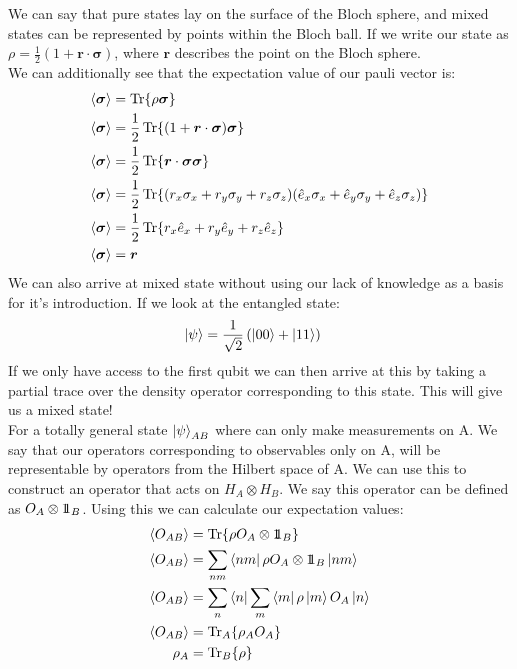 We can say that pure states lay on the surface of the Bloch sphere, and mixed states can be represented by points within the Bloch ball. If we write our state as $\rho = \frac{1}{2}(1 + \bm{r}\cdot\bm{\sigma})$, where $\bm{r}$ describes the point on the Bloch sphere.\\
We can additionally see that the expectation value of our pauli vector is:
\begin{align*}
	\expval{\bm{\sigma}} &= \Tr{\rho\bm{\sigma}} \\
	\expval{\bm{\sigma}} &= \frac{1}{2}\Tr{(1+ \bm{r}\cdot\bm{\sigma})\bm{\sigma}} \\
	\expval{\bm{\sigma}} &= \frac{1}{2}\Tr{\bm{r}\cdot\bm{\sigma}\bm{\sigma}} \\
	\expval{\bm{\sigma}} &= \frac{1}{2}\Tr{(r_x\sigma_x + r_y\sigma_y + r_z\sigma_z)(\hat{e}_x\sigma_x + \hat{e}_y\sigma_y + \hat{e}_z\sigma_z)} \\
	\expval{\bm{\sigma}} &= \frac{1}{2}\Tr{r_x\hat{e}_x + r_y\hat{e}_y + r_z\hat{e}_z} \\
	\expval{\bm{\sigma}} &= \bm{r}
\end{align*}
We can also arrive at mixed state without using our lack of knowledge as a basis for it's introduction. If we look at the entangled state:
\begin{align*}
	\ket{\psi} &= \frac{1}{\sqrt{2}} \left(\ket{00} + \ket{11}\right)
\end{align*}
If we only have access to the first qubit we can then arrive at this by taking a partial trace over the density operator corresponding to this state. This will give us a mixed state!\\
For a totally general state $\ket{\psi}_{AB}$ where can only make measurements on A. We say that our operators corresponding to observables only on A, will be representable by operators from the Hilbert space of A.
We can use this to construct an operator that acts on $H_A\otimes H_B$. We say this operator can be defined as $O_A\otimes 1\!\!1_B$. Using this we can calculate our expectation values:
\begin{align*}
	\expval{O_{AB}} &= \Tr{\rho O_A\otimes1\!\!1_B} \\
	\expval{O_{AB}} &= \sum_{nm}\bra{nm}\rho O_A\otimes1\!\!1_B \ket{nm} \\
	\expval{O_{AB}} &= \sum_{n}\bra{n}\sum_m\bra{m}\rho\ket{m} O_A \ket{n} \\
	\expval{O_{AB}} &= \Tr_A\{\rho_AO_A\} \\
	\rho_A &= \Tr_B\{\rho\}
\end{align*}
